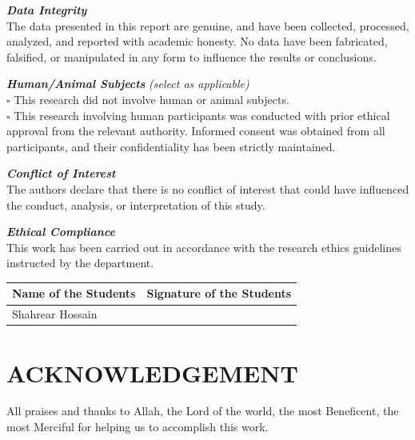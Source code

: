 \documentclass[12pt,a4paper,oneside]{report}
\begin{document}
\vspace{0.15cm}
\noindent\textbf{\textit{Data Integrity}}\\
The data presented in this report are genuine, and have been collected, processed, analyzed, and reported with academic honesty. No data have been fabricated, falsified, or manipulated in any form to influence the results or conclusions.

\vspace{0.15cm}
\noindent\textbf{\textit{Human/Animal Subjects}} \textit{(select as applicable)}\\
$\square$ This research did not involve human or animal subjects.\\
$\square$ This research involving human participants was conducted with prior ethical approval from the relevant authority. Informed consent was obtained from all participants, and their confidentiality has been strictly maintained.

\vspace{0.15cm}
\noindent\textbf{\textit{Conflict of Interest}}\\
The authors declare that there is no conflict of interest that could have influenced the conduct, analysis, or interpretation of this study.

\vspace{0.15cm}
\noindent\textbf{\textit{Ethical Compliance}}\\
This work has been carried out in accordance with the research ethics guidelines instructed by the department.

\vspace{0.4cm}

\noindent\begin{tabular}{|>{\centering\arraybackslash}p{6.8cm}|>{\centering\arraybackslash}p{6.8cm}|}
\hline
\textbf{Name of the Students} & \textbf{Signature of the Students} \\
\hline
\rule{0pt}{1.0cm} Shahrear Hossain & \rule{0pt}{1.0cm} \\[0.3cm]
\hline
\end{tabular}

\clearpage


\chapter*{ACKNOWLEDGEMENT}

\noindent All praises and thanks to Allah, the Lord of the world, the most Beneficent, the most Merciful for helping us to accomplish this work.
\end{document}
